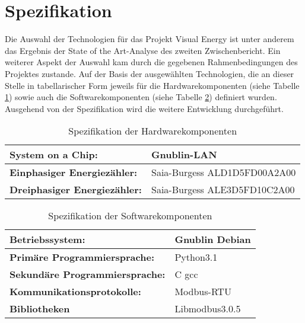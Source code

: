 \documentclass[Bachelorarbeit.tex]{subfiles}
\begin{document}
\newpage

\section{Spezifikation}
Die Auswahl der Technologien für das Projekt Visual Energy ist unter anderem das 
Ergebnis der State of the Art-Analyse des zweiten Zwischenbericht. Ein weiterer 
Aspekt der Auswahl kam durch die gegebenen Rahmenbedingungen des Projektes 
zustande. Auf der Basis der ausgewählten Technologien, die an dieser Stelle in 
tabellarischer Form jeweils für die Hardwarekomponenten (siehe Tabelle \ref{tab:spez_hardware}) sowie auch die Softwarekomponenten (siehe Tabelle \ref{tab:spez_software}) definiert wurden. Ausgehend von der Spezifikation 
wird die weitere Entwicklung durchgeführt.\\

\begin{table}[h]
\begin{tabular}{|p{40ex}|>{\centering\arraybackslash}p{40ex}|}
\hline 
\rule[0ex]{0pt}{2.5ex} \textbf{System on a Chip:}  & Gnublin-LAN \\ 
\hline 
\rule[0ex]{0pt}{2.5ex} \textbf{Einphasiger Energiezähler:} & Saia-Burgess ALD1D5FD00A2A00 \\ 
\hline 
\rule[0ex]{0pt}{2.5ex} \textbf{Dreiphasiger Energiezähler: } & Saia-Burgess ALE3D5FD10C2A00 \\ 
\hline 
\end{tabular} 
\caption{Spezifikation der Hardwarekomponenten}
\label{tab:spez_hardware}
\end{table}

\begin{table}[h]
\begin{tabular}{|p{40ex}|>{\centering\arraybackslash}p{40ex}|}
\hline 
\rule[0ex]{0pt}{2.5ex} \textbf{Betriebssystem:} & Gnublin Debian \\ 
\hline 
\rule[0ex]{0pt}{2.5ex} \textbf{Primäre Programmiersprache:} & Python3.1 \\ 
\hline 
\rule[0ex]{0pt}{2.5ex} \textbf{Sekundäre Programmiersprache:} & C gcc \\ 
\hline 
\rule[0ex]{0pt}{2.5ex} \textbf{Kommunikationsprotokolle:} & Modbus-RTU \\ 
\hline 
\rule[0ex]{0pt}{2.5ex} \textbf{Bibliotheken} & Libmodbus3.0.5 \\ 
\hline 
\end{tabular} 
\caption{Spezifikation der Softwarekomponenten}
\label{tab:spez_software}
\end{table}
\end{document}
